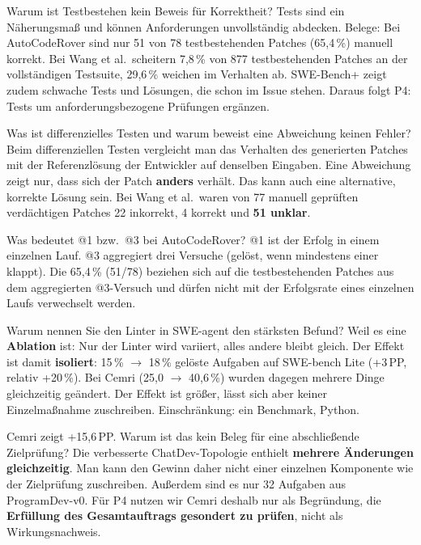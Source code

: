 \documentclass[12pt,a4paper]{article}
\newcommand{\pp}{\,PP}
\begin{document}
\begin{qa}{Warum ist Testbestehen kein Beweis für Korrektheit?}
Tests sind ein Näherungsmaß und können Anforderungen unvollständig abdecken. Belege: Bei AutoCodeRover sind nur 51 von 78 testbestehenden Patches (65,4\,\%) manuell korrekt. Bei Wang et al.\ scheitern 7,8\,\% von 877 testbestehenden Patches an der vollständigen Testsuite, 29,6\,\% weichen im Verhalten ab. SWE-Bench+ zeigt zudem schwache Tests und Lösungen, die schon im Issue stehen. Daraus folgt P4: Tests um anforderungsbezogene Prüfungen ergänzen.
\end{qa}

\begin{qa}{Was ist differenzielles Testen und warum beweist eine Abweichung keinen Fehler?}
Beim differenziellen Testen vergleicht man das Verhalten des generierten Patches mit der Referenzlösung der Entwickler auf denselben Eingaben. Eine Abweichung zeigt nur, dass sich der Patch \textbf{anders} verhält. Das kann auch eine alternative, korrekte Lösung sein. Bei Wang et al.\ waren von 77 manuell geprüften verdächtigen Patches 22 inkorrekt, 4 korrekt und \textbf{51 unklar}.
\end{qa}

\begin{qa}{Was bedeutet @1 bzw.\ @3 bei AutoCodeRover?}
@1 ist der Erfolg in einem einzelnen Lauf. @3 aggregiert drei Versuche (gelöst, wenn mindestens einer klappt). Die 65,4\,\% (51/78) beziehen sich auf die testbestehenden Patches aus dem aggregierten @3-Versuch und dürfen nicht mit der Erfolgsrate eines einzelnen Laufs verwechselt werden.
\end{qa}

\begin{qa}{Warum nennen Sie den Linter in SWE-agent den stärksten Befund?}
Weil es eine \textbf{Ablation} ist: Nur der Linter wird variiert, alles andere bleibt gleich. Der Effekt ist damit \textbf{isoliert}: 15\,\% $\to$ 18\,\% gelöste Aufgaben auf SWE-bench Lite (+3\pp, relativ +20\,\%). Bei Cemri (25,0 $\to$ 40,6\,\%) wurden dagegen mehrere Dinge gleichzeitig geändert. Der Effekt ist größer, lässt sich aber keiner Einzelmaßnahme zuschreiben. Einschränkung: ein Benchmark, Python.
\end{qa}

\begin{qa}{Cemri zeigt +15,6\,PP. Warum ist das kein Beleg für eine abschließende Zielprüfung?}
Die verbesserte ChatDev-Topologie enthielt \textbf{mehrere Änderungen gleichzeitig}. Man kann den Gewinn daher nicht einer einzelnen Komponente wie der Zielprüfung zuschreiben. Außerdem sind es nur 32 Aufgaben aus ProgramDev-v0. Für P4 nutzen wir Cemri deshalb nur als Begründung, die \textbf{Erfüllung des Gesamtauftrags gesondert zu prüfen}, nicht als Wirkungsnachweis.
\end{qa}
\end{document}
